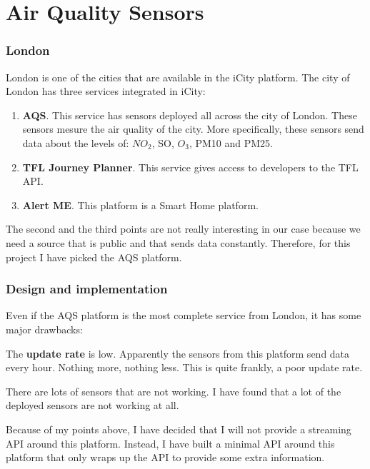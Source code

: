  
\section{Air Quality Sensors}
\label{sec:implementation_aqs}

\subsubsection*{London}

London is one of the cities that are available in the iCity platform. The city
of London has three services integrated in iCity:

\begin{enumerate}
  \itemsep0em
  \item {\bf \ac{AQS}}. This service has sensors deployed all across
the city of London. These sensors mesure the air quality of the city. More
specifically, these sensors send data about the levels of: $NO_2$, SO, $O_3$,
PM10 and PM25.
  \item {\bf TFL Journey Planner}. This service gives access to developers to
the TFL \ac{API}.
  \item {\bf Alert ME}. This platform is a Smart Home platform.
\end{enumerate}

The second and the third points are not really interesting in our case because
we need a source that is public and that sends data constantly. Therefore, for
this project I have picked the \ac{AQS} platform.

\subsubsection*{Design and implementation}

Even if the \ac{AQS} platform is the most complete service from London, it has
some major drawbacks:

\mylist
  \item The {\bf update rate} is low. Apparently the sensors from this platform
send data every hour. Nothing more, nothing less. This is quite frankly, a
poor update rate.
  \item There are lots of sensors that are not working. I have found that a lot
of the deployed sensors are not working at all.
\mylistend

Because of my points above, I have decided that I will not provide a streaming
\ac{API} around this platform. Instead, I have built a minimal \ac{API} around
this platform that only wraps up the \ac{API} to provide some extra information.

